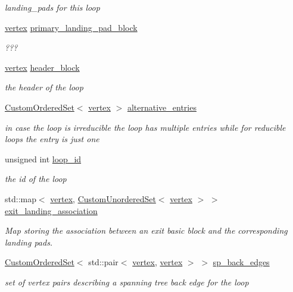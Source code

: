 \begin{DoxyCompactItemize}
\begin{DoxyCompactList}\small\item\em landing\+\_\+pads for this loop \end{DoxyCompactList}\item 
\hyperlink{graph_8hpp_abefdcf0544e601805af44eca032cca14}{vertex} \hyperlink{classLoop_aaffc670c934b658baa60f714abf65d40}{primary\+\_\+landing\+\_\+pad\+\_\+block}
\begin{DoxyCompactList}\small\item\em ??? \end{DoxyCompactList}\item 
\hyperlink{graph_8hpp_abefdcf0544e601805af44eca032cca14}{vertex} \hyperlink{classLoop_ab97018bd50c8a5923adbc04fb05df554}{header\+\_\+block}
\begin{DoxyCompactList}\small\item\em the header of the loop \end{DoxyCompactList}\item 
\hyperlink{classCustomOrderedSet}{Custom\+Ordered\+Set}$<$ \hyperlink{graph_8hpp_abefdcf0544e601805af44eca032cca14}{vertex} $>$ \hyperlink{classLoop_a56e71239ca4a6ae07f70c2509610464f}{alternative\+\_\+entries}
\begin{DoxyCompactList}\small\item\em in case the loop is irreducible the loop has multiple entries while for reducible loops the entry is just one \end{DoxyCompactList}\item 
unsigned int \hyperlink{classLoop_a875b4998571a8f406f4e15341b9f8039}{loop\+\_\+id}
\begin{DoxyCompactList}\small\item\em the id of the loop \end{DoxyCompactList}\item 
std\+::map$<$ \hyperlink{graph_8hpp_abefdcf0544e601805af44eca032cca14}{vertex}, \hyperlink{classCustomUnorderedSet}{Custom\+Unordered\+Set}$<$ \hyperlink{graph_8hpp_abefdcf0544e601805af44eca032cca14}{vertex} $>$ $>$ \hyperlink{classLoop_a91daa17db371e729f24f7b3447ece56c}{exit\+\_\+landing\+\_\+association}
\begin{DoxyCompactList}\small\item\em Map storing the association between an exit basic block and the corresponding landing pads. \end{DoxyCompactList}\item 
\hyperlink{classCustomOrderedSet}{Custom\+Ordered\+Set}$<$ std\+::pair$<$ \hyperlink{graph_8hpp_abefdcf0544e601805af44eca032cca14}{vertex}, \hyperlink{graph_8hpp_abefdcf0544e601805af44eca032cca14}{vertex} $>$ $>$ \hyperlink{classLoop_a046deb584fe101be74d6a458e5cfe369}{sp\+\_\+back\+\_\+edges}
\begin{DoxyCompactList}\small\item\em set of vertex pairs describing a spanning tree back edge for the loop \end{DoxyCompactList}\end{DoxyCompactItemize}

